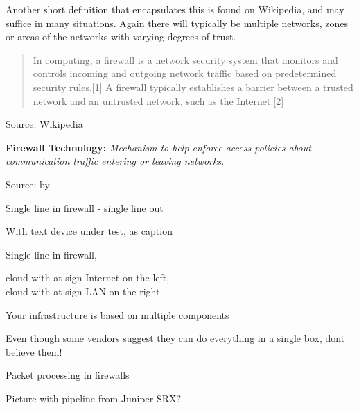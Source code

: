 \documentclass[Screen16to9,17pt]{foils}
\begin{document}
Another short definition that encapsulates this is found on Wikipedia, and may suffice in many situations. Again there will typically be multiple networks, zones or areas of the networks with varying degrees of trust.
\begin{quote}
In computing, a firewall is a network security system that monitors and controls incoming and outgoing network traffic based on predetermined security rules.[1] A firewall typically establishes a barrier between a trusted network and an untrusted network, such as the Internet.[2]
\end{quote}
Source: Wikipedia

 \begin{list2}
 \item {\bf Firewall Technology:} \emph{Mechanism to help enforce access policies about communication traffic entering or leaving networks.}
\end{list2}

Source:  by \citeauthor{lyles} \citeyear{lyles}





Single line in firewall - single line out

With text device under test, as caption


Single line in firewall,

cloud with at-sign Internet on the left,\\
cloud with at-sign LAN on the right

Your infrastructure is based on multiple components


Even though some vendors suggest they can do everything in a single box, dont believe them!











Packet processing in firewalls

Picture with pipeline from Juniper SRX?
\end{document}
